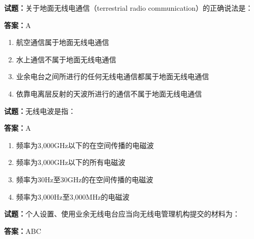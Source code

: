 \documentclass{ctexbook}
\begin{document}




\vspace{1em}

\textbf{试题：}关于地面无线电通信（terrestrial radio communication）的正确说法是： 

\textbf{答案：}A 

\begin{enumerate}[leftmargin=3em]
  \item 航空通信属于地面无线电通信 

  \item 水上通信不属于地面无线电通信 

  \item 业余电台之间所进行的任何无线电通信都属于地面无线电通信 

  \item 依靠电离层反射的天波所进行的通信不属于地面无线电通信 

\end{enumerate}





\vspace{1em}

\textbf{试题：}无线电波是指： 


\textbf{答案：}A 

\begin{enumerate}[leftmargin=3em]
  \item 频率为3,000GHz以下的在空间传播的电磁波 

  \item 频率为3,000GHz以下的所有电磁波 

  \item 频率为30Hz至30GHz的在空间传播的电磁波 

  \item 频率为3,000Hz至3,000MHz的电磁波 

\end{enumerate}





\vspace{1em}

\textbf{试题：}个人设置、使用业余无线电台应当向无线电管理机构提交的材料为： 

\textbf{答案：}ABC 
\end{document}
